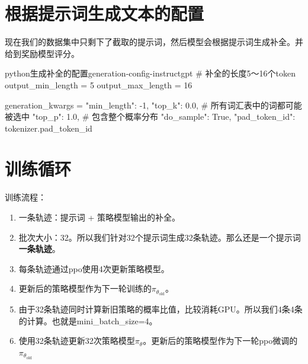 \documentclass[lang=cn,newtx,10pt,scheme=chinese]{elegantbook}
\begin{document}
\section{根据提示词生成文本的配置}

\begin{marker}
现在我们的数据集中只剩下了截取的提示词，然后模型会根据提示词生成补全。并给到奖励模型评分。
\end{marker}

\begin{codebox}{python}{生成补全的配置}{generation-config-instructgpt}
# 补全的长度5～16个token
output_min_length = 5
output_max_length = 16

generation_kwargs = {
    "min_length": -1,
    "top_k": 0.0,  # 所有词汇表中的词都可能被选中
    "top_p": 1.0,  # 包含整个概率分布
    "do_sample": True,
    "pad_token_id": tokenizer.pad_token_id
}
\end{codebox}

\section{训练循环}

\begin{marker}
训练流程：
\begin{enumerate}
    \item 一条轨迹：提示词 + 策略模型输出的补全。
    \item 批次大小：32。所以我们针对32个提示词生成32条轨迹。那么还是一个提示词\textbf{一条轨迹}。
    \item 每条轨迹通过ppo使用4次更新策略模型。
    \item 更新后的策略模型作为下一轮训练的$\pi_{\theta_\text{old}}$。
    \item 由于32条轨迹同时计算新旧策略的概率比值，比较消耗GPU。所以我们4条4条的计算。也就是mini\_batch\_size=4。
    \item 使用32条轨迹更新32次策略模型$\pi_\theta$。更新后的策略模型作为下一轮ppo微调的$\pi_{\theta_\text{old}}$
\end{enumerate}
\end{marker}
\end{document}
